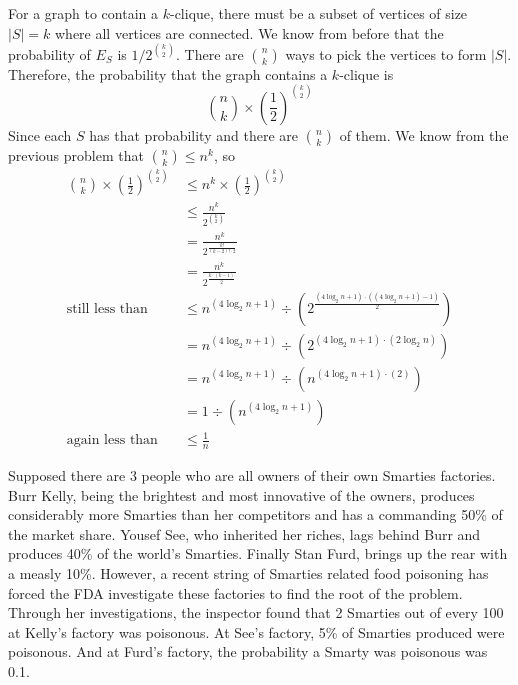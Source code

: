 \documentclass[11pt]{article}
\begin{document}
\begin{solution}
\begin{Parts}
\Part For a graph to contain a $k$-clique, there must be a subset of vertices
of size $|S|=k$ where all vertices are connected. We know from before that the 
probability of $E_S$ is $1 / 2^{\binom{k}{2}}$. There are $\binom{n}{k}$ ways 
to pick the vertices to form $|S|$. Therefore, the probability that the graph
contains a $k$-clique is
\[
    \binom{n}{k} \times \left( \frac{1}{2} \right)^{\binom{k}{2}}
\]
Since each $S$ has that probability and there are $\binom{n}{k}$ of them. We 
know from the previous problem that $\binom{n}{k} \leq n^k$, so
\[
    \begin{split}
        \binom{n}{k} \times \left( \frac{1}{2} \right)^{\binom{k}{2}} &\leq 
        n^k \times \left( \frac{1}{2} \right)^{\binom{k}{2}} \\
        &\leq \frac{n^k}{2^{\binom{k}{2}}} \\
        &= \frac{n^k}{2^\frac{k!}{(k-2)!\cdot 2}} \\
        &= \frac{n^k}{2^\frac{k\cdot(k-1)}{2}} \\
        \text{still less than} \quad &\leq n^{(4\log_2 n + 1)} \div \left( 2^\frac{(4\log_2 n + 1) \cdot((4\log_2 n + 1)-1)}{2} \right) \\
        &= n^{(4\log_2 n + 1)} \div \left( 2^{(4\log_2 n + 1) \cdot(2\log_2 n)} \right) \\
        &= n^{(4\log_2 n + 1)} \div \left( n^{(4\log_2 n + 1) \cdot(2)} \right) \\
        &= 1 \div \left( n^{(4\log_2 n + 1)} \right) \\
        \text{again less than} \quad &\leq \frac{1}{n}
    \end{split}
\]

\end{Parts}

\end{solution}


Supposed there are 3 people who are all owners of their own Smarties factories. 
Burr Kelly, being the brightest and most innovative of the owners, produces 
considerably more Smarties than her competitors and has a commanding 50\% of the 
market share. Yousef See, who inherited her riches, lags behind Burr and produces 
40\% of the world's Smarties. Finally Stan Furd, brings up the rear with a measly 
10\%. However, a recent string of Smarties related food poisoning has forced the 
FDA investigate these factories to find the root of the problem. Through her 
investigations, the inspector found that 2 Smarties out of every 100 at Kelly's 
factory was poisonous. At See's factory, 5\% of Smarties produced were poisonous. 
And at Furd's factory, the probability a Smarty was poisonous was 0.1. 
\end{document}
